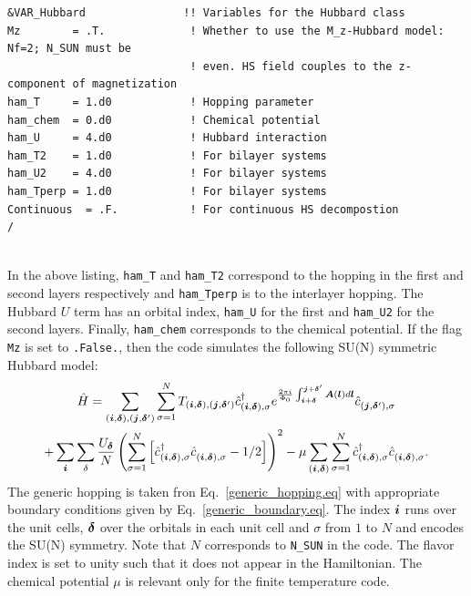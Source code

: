 \begin{lstlisting}[style=fortran,escapechar=\#,breaklines=true]
&VAR_Hubbard               !! Variables for the Hubbard class
Mz        = .T.             ! Whether to use the M_z-Hubbard model: Nf=2; N_SUN must be  
                            ! even. HS field couples to the z-component of magnetization
ham_T     = 1.d0            ! Hopping parameter
ham_chem  = 0.d0            ! Chemical potential
ham_U     = 4.d0            ! Hubbard interaction
ham_T2    = 1.d0            ! For bilayer systems
ham_U2    = 4.d0            ! For bilayer systems
ham_Tperp = 1.d0            ! For bilayer systems
Continuous  = .F.           ! For continuous HS decompostion
/
               
\end{lstlisting}
In the above listing, \texttt{ham\_T} and \texttt{ham\_T2} correspond to the hopping in the first and second layers respectively and  \texttt{ham\_Tperp} is to the interlayer hopping.   The Hubbard $U$ term has an orbital index, \texttt{ham\_U}  for the first and \texttt{ham\_U2} for the second layers.  Finally,  \texttt{ham\_chem}  corresponds to the chemical potential.    If the flag \texttt{Mz} is set to \texttt{.False.}, then the code simulates the following SU(N) symmetric Hubbard model:
\begin{multline}
\hat{H} = \sum_{(\ve{i},\ve{\delta}), (\ve{j},\ve{\delta}')}  \sum_{\sigma =1}^{N}  T_{(\ve{i},\ve{\delta}), (\ve{j},\ve{\delta}')}    \hat{c}^{\dagger}_{(\ve{i},\ve{\delta}), \sigma }   e^{\frac{2 \pi i}{\Phi_0} \int_{\ve{i} + \ve{\delta}}^{\ve{j} + \ve{\delta}'}  
     \vec{A}(\ve{l})  d \ve{l}} \hat{c}^{}_{(\ve{j},\ve{\delta}'),\sigma} \\
 + \sum_{\vec{i}} \sum_{\delta}   \frac{U_{\ve{\delta}} }{N} \left(\sum_{\sigma=1}^{N}  \left[   \hat{c}^{\dagger}_{(\vec{i},\ve{\delta}),\sigma } 
    \hat{c}^{\phantom\dagger}_{(\vec{i}, \ve{\delta}),\sigma }  - 1/2  \right] \right)^2
    - \mu \sum_{(\ve{i},\ve{\delta})}  \sum_{\sigma =1}^{N} \hat{c}^{\dagger}_{(\vec{i},\ve{\delta}),\sigma } \hat{c}^{\phantom\dagger}_{(\vec{i},\ve{\delta}),\sigma } .
\end{multline}
The  generic hopping is taken fron Eq.~\eqref{generic_hopping.eq}   with appropriate boundary conditions given by Eq.~\eqref{generic_boundary.eq}.  The index $\boldsymbol{i}$ runs over the unit cells, $\boldsymbol{\delta}$ over the orbitals in each unit cell and $\sigma$  from $1$ to $N$  and encodes the SU(N) symmetry.    Note that  $N$ corresponds to \texttt{N\_SUN}  in the code.  The flavor index is set to  unity such that it does not appear in the  Hamiltonian. The chemical potential $\mu$ is relevant only for the finite temperature code. 

